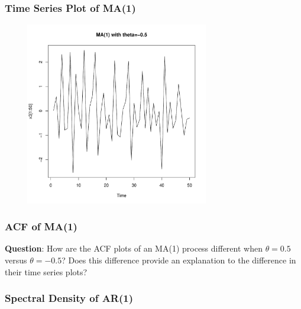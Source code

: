 \documentclass[%
xcolor=pdftex]{beamer}
\begin{document}
\begin{frame}
\frametitle{Time Series Plot of MA(1)}


\includegraphics[width=100mm, height=80mm]{ma1_2ts.pdf}


\end{frame}

\begin{frame}
\frametitle{ACF of MA(1)}

\textbf{Question}: How are the ACF plots of an MA(1) process different when $\theta=0.5$ versus $\theta=-0.5$? Does this difference provide an explanation to the difference in their time series plots?

\end{frame}

\begin{frame}
\frametitle{Spectral Density of AR(1)}



\end{frame}
\end{document}
